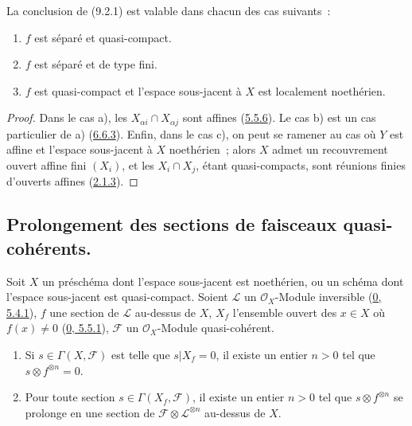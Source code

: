 \begin{corollary}[9.2.2]
\label{I.9.2.2-fr}
La conclusion de (9.2.1) est valable dans chacun des cas suivants~:
\begin{enumerate}
\item[a)] $f$ est séparé et quasi-compact.
\item[b)] $f$ est séparé et de type fini.
\item[c)] $f$ est quasi-compact et l'espace sous-jacent à $X$ est localement
noethérien.
\end{enumerate}
\end{corollary}

\begin{proof}
Dans le cas a), les $X_{\alpha i}\cap X_{\alpha j}$ sont affines
(\hyperref[I.5.5.6-fr]{5.5.6}). Le cas b) est un cas particulier de a)
(\hyperref[I.6.6.3-fr]{6.6.3}). Enfin, dans le cas c), on peut se ramener au
cas où $Y$ est affine et l'espace sous-jacent à $X$ noethérien~; alors $X$
admet un recouvrement ouvert affine fini $(X_i)$, et les $X_i\cap X_j$, étant
quasi-compacts, sont réunions finies d'ouverts affines
(\hyperref[I.2.1.3-fr]{2.1.3}).
\end{proof}

\subsection{Prolongement des sections de faisceaux quasi-cohérents.}
\label{subsection:I.9.3-fr}

\begin{theorem}[9.3.1]
\label{I.9.3.1-fr}
Soit $X$ un préschéma dont l'espace sous-jacent est noethérien, ou un schéma
dont l'espace sous-jacent est quasi-compact. Soient $\mathscr{L}$ un
$\mathscr{O}_X$-Module inversible
(\hyperref[0.5.4.1-fr]{0, 5.4.1}), $f$ une section de $\mathscr{L}$ au-dessus
de $X$, $X_f$ l'ensemble ouvert des $x\in X$ où $f(x)\neq0$
(\hyperref[0.5.5.1-fr]{0, 5.5.1}), $\mathscr{F}$ un
$\mathscr{O}_X$-Module quasi-cohérent.
\begin{enumerate}
\item[(i)] Si $s\in\Gamma(X,\mathscr{F})$ est telle que $s|X_f=0$, il existe
un entier $n>0$ tel que $s\otimes f^{\otimes n}=0$.
\item[(ii)] Pour toute section $s\in\Gamma(X_f,\mathscr{F})$, il existe un
entier $n>0$ tel que $s\otimes f^{\otimes n}$ se prolonge en une section de
$\mathscr{F}\otimes\mathscr{L}^{\otimes n}$ au-dessus de $X$.
\end{enumerate}
\end{theorem}

